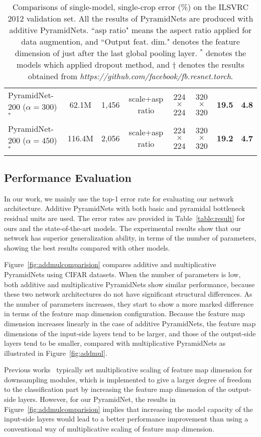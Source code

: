 \documentclass[10pt,twocolumn,letterpaper]{article}
\begin{document}
\begin{table*}[t]
\begin{center}
\begin{tabular}{|l|c|c|c|c|c|c|c|}
PyramidNet-200 ($\alpha=300$)$^*$ & 62.1M & 1,456 & scale+asp ratio & 224$\times$224 & 320$\times$320 & {\bf19.5} & {\bf4.8}\\
PyramidNet-200 ($\alpha=450$)$^*$ & 116.4M & 2,056 & scale+asp ratio & 224$\times$224 & 320$\times$320 & {\bf19.2} & {\bf4.7}\\
\hline
\end{tabular}
\end{center}
\caption{Comparisons of single-model, single-crop error (\%) on the ILSVRC 2012 validation set. All the results of PyramidNets are produced with additive PyramidNets. ``asp ratio" means the aspect ratio applied for data augmention, and ``Output feat. dim." denotes the feature dimension of just after the last global pooling layer. $^*$ denotes the models which applied dropout method, and $\dagger$ denotes the results obtained from {\it https://github.com/facebook/fb.resnet.torch}.}
\label{table:imagenetres}
\end{table*}

\subsection{Performance Evaluation}

In our work, we mainly use the top-1 error rate for evaluating our network architecture. Additive PyramidNets with both basic and pyramidal bottleneck residual units are used. The error rates are provided in Table~\ref{table:result} for ours and the state-of-the-art models. The experimental results show that our network has superior generalization ability, in terms of the number of parameters, showing the best results compared with other models. 

Figure~\ref{fig:addmulcomparision} compares additive and multiplicative PyramidNets using CIFAR datasets. When the number of parameters is low, both additive and multiplicative PyramidNets show similar performance, because these two network architectures do not have significant structural differences. As the number of parameters increases, they start to show a more marked difference in terms of the feature map dimension configuration. Because the feature map dimension increases linearly in the case of additive PyramidNets, the feature map dimensions of the input-side layers tend to be larger, and those of the output-side layers tend to be smaller, compared with multiplicative PyramidNets as illustrated in Figure~\ref{fig:addmul}.

Previous works~\cite{resnet, VGG} typically set multiplicative scaling of feature map dimension for downsampling modules, which is implemented to give a larger degree of freedom to the classification part by increasing the feature map dimension of the output-side layers. However, for our PyramidNet, the results in Figure~\ref{fig:addmulcomparision} implies that increasing the model capacity of the input-side layers would lead to a better performance improvement than using a conventional way of multiplicative scaling of feature map dimension.
\end{document}
